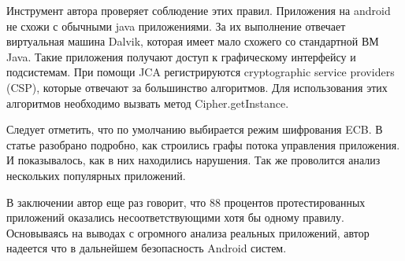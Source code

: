 \documentclass{article}
\begin{document}
Инструмент автора проверяет соблюдение этих правил. Приложения на android не схожи с обычными java приложениями. За их выполнение отвечает виртуальная машина Dalvik, которая имеет мало схожего со стандартной ВМ Java. Такие приложения получают доступ к графическому интерфейсу и подсистемам. При помощи JCA регистрируются cryptographic service
providers (CSP), которые отвечают за большинство алгоритмов. Для использования этих алгоритмов необходимо вызвать метод Cipher.getInstance.

Следует отметить, что по умолчанию выбирается режим шифрования ECB. В статье разобрано подробно, как строились графы потока управления приложения. И показывалось, как в них находились нарушения. Так же проволится анализ нескольких популярных приложений.

В заключении автор еще раз говорит, что 88 процентов протестированных приложений оказались несоответствующими хотя бы одному правилу. Основываясь на выводах с огромного анализа реальных приложений, автор надеется что в дальнейшем безопасность Android систем. 
	
\end{document}
